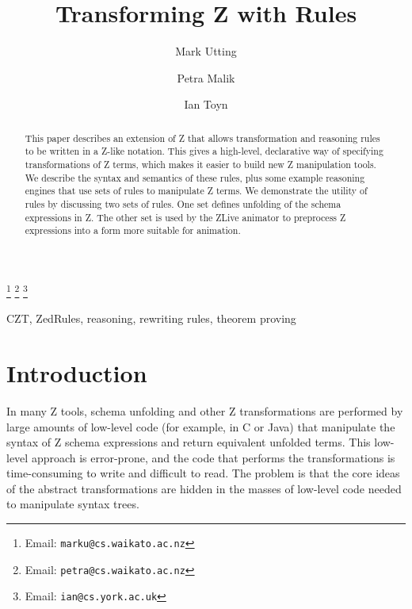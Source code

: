 \documentclass{entcs}
\begin{document}
\begin{frontmatter}
  \title{Transforming Z with Rules}
  \author{Mark Utting}
  \address{Department of Computer Science\\
    The University of Waikato\\
    Hamilton, New Zealand} 
  \author{Petra Malik}
  \address{Department of Computer Science\\
    The University of Waikato\\
    Hamilton, New Zealand} 
  \author{Ian Toyn}
  \address{Department of Computer Science\\
    The University of York\\
    Heslington, York, UK}
  \thanks[emailMark]{Email: \texttt{marku@cs.waikato.ac.nz}}
  \thanks[emailPetra]{Email: \texttt{petra@cs.waikato.ac.nz}}
  \thanks[emailIan]{Email: \texttt{ian@cs.york.ac.uk}}
\begin{abstract}
  This paper describes an extension of Z that allows transformation
  and reasoning rules to be written in a Z-like notation.  This gives
  a high-level, declarative way of specifying transformations of Z
  terms, which makes it easier to build new Z manipulation tools.  We
  describe the syntax and semantics of these rules, plus some example
  reasoning engines that use sets of rules to manipulate Z terms.  We
  demonstrate the utility of rules by discussing two sets of rules.
  One set defines unfolding of the schema expressions in Z.  The other
  set is used by the ZLive animator to preprocess Z expressions into
  a form more suitable for animation.
\end{abstract}
\begin{keyword}
  CZT, ZedRules, reasoning, rewriting rules, theorem proving
\end{keyword}
\end{frontmatter}



\section{Introduction}

In many Z tools, schema unfolding and other Z transformations are performed
by large amounts of low-level code (for example, in C or Java) that
manipulate the syntax of Z schema expressions and return equivalent
unfolded terms.  This low-level approach is error-prone, and the code that
performs the transformations is time-consuming to write and difficult to
read.  The problem is that the core ideas of the abstract transformations are
hidden in the masses of low-level code needed to manipulate syntax trees.
\end{document}

